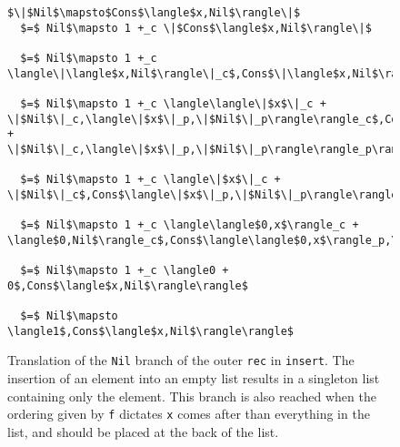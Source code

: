 \documentclass[12pt,letterpaper]{article}
\newcommand{\T}[1]{\texttt{#1}}
\begin{document}
\begin{figure}[H]
\caption{Translation of the \T{Nil} branch of the outer \T{rec} in \T{insert}.
The insertion of an element into an empty list results in a singleton list containing only the element.
This branch is also reached when the ordering given by \T{f} dictates \T{x} comes after than everything in the list,
  and should be placed at the back of the list.
}
\label{fig:insert_nil}
\begin{lstlisting}
$\|$Nil$\mapsto$Cons$\langle$x,Nil$\rangle\|$
  $=$ Nil$\mapsto 1 +_c \|$Cons$\langle$x,Nil$\rangle\|$

  $=$ Nil$\mapsto 1 +_c \langle\|\langle$x,Nil$\rangle\|_c$,Cons$\|\langle$x,Nil$\rangle\|_p\rangle$

  $=$ Nil$\mapsto 1 +_c \langle\langle\|$x$\|_c + \|$Nil$\|_c,\langle\|$x$\|_p,\|$Nil$\|_p\rangle\rangle_c$,Cons$\langle\|$x$\|_c + \|$Nil$\|_c,\langle\|$x$\|_p,\|$Nil$\|_p\rangle\rangle_p\rangle$

  $=$ Nil$\mapsto 1 +_c \langle\|$x$\|_c + \|$Nil$\|_c$,Cons$\langle\|$x$\|_p,\|$Nil$\|_p\rangle\rangle$

  $=$ Nil$\mapsto 1 +_c \langle\langle$0,x$\rangle_c + \langle$0,Nil$\rangle_c$,Cons$\langle\langle$0,x$\rangle_p,\langle$0,Nil$\rangle_p\rangle\rangle$

  $=$ Nil$\mapsto 1 +_c \langle0 + 0$,Cons$\langle$x,Nil$\rangle\rangle$

  $=$ Nil$\mapsto \langle1$,Cons$\langle$x,Nil$\rangle\rangle$
\end{lstlisting}
\end{figure}
\end{document}
